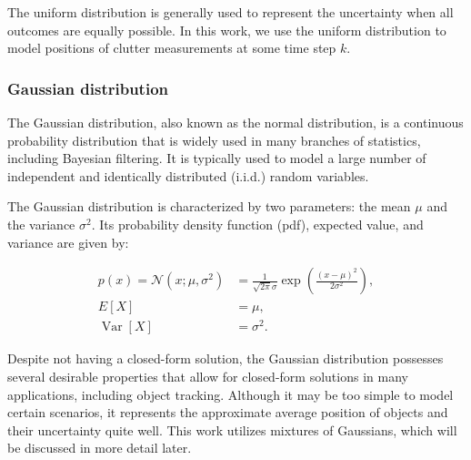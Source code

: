 The uniform distribution is generally used to represent the uncertainty when
all outcomes are equally possible. In this work, we use the uniform distribution
to model positions of clutter measurements at some time step $k$.

\subsubsection{Gaussian distribution}

The Gaussian distribution, also known as the normal distribution, is a 
continuous probability distribution that is widely used in many branches
of statistics, including Bayesian filtering. It is typically used to model
a large number of independent and identically distributed (i.i.d.) random variables.

The Gaussian distribution is characterized by two parameters: the mean 
$\mu$ and the variance $\sigma^2$. Its probability density function (pdf), 
expected value, and variance are given by:

$$
\begin{aligned}
    p(x)
        =\mathscr{N}\left(x ; \mu, \sigma^2\right)
        &=\frac{1}{\sqrt{2 \pi} \sigma} \exp \left(\frac{(x-\mu)^2}{2 \sigma^2}\right), \\
    E[X] &= \mu, \\
    \operatorname{Var}[X] &= \sigma^2.
\end{aligned}
$$

Despite not having a closed-form solution, the Gaussian distribution 
possesses several desirable properties that allow for closed-form solutions 
in many applications, including object tracking. Although it may be too 
simple to model certain scenarios, it represents the approximate average 
position of objects and their uncertainty quite well. This work utilizes
mixtures of Gaussians, which will be discussed in more detail later.

